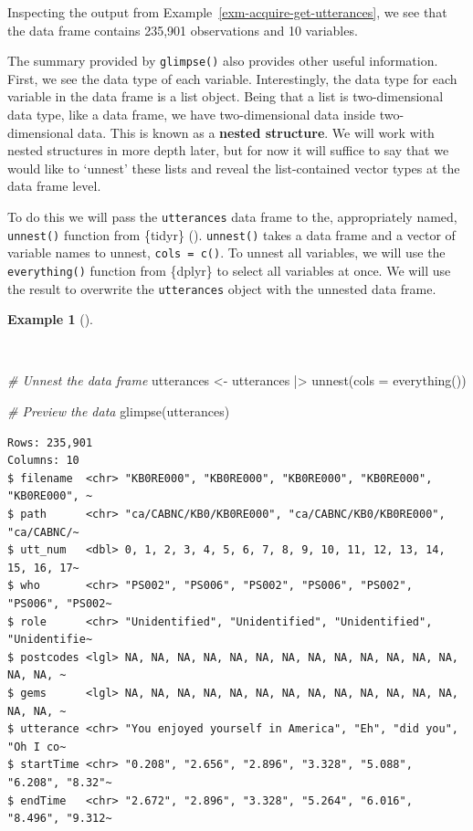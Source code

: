 \documentclass[
  letterpaper,
]{latex/krantz}
\newenvironment{Shaded}{\begin{snugshade}}{\end{snugshade}}
\newcommand{\AttributeTok}[1]{\textcolor[rgb]{0.00,0.00,0.00}{#1}}
\newcommand{\CommentTok}[1]{\textcolor[rgb]{0.00,0.00,0.00}{\textit{#1}}}
\newcommand{\FunctionTok}[1]{\textcolor[rgb]{0.00,0.00,0.00}{#1}}
\newcommand{\NormalTok}[1]{\textcolor[rgb]{0.00,0.00,0.00}{#1}}
\newcommand{\OtherTok}[1]{\textcolor[rgb]{0.00,0.00,0.00}{#1}}
\newcommand{\SpecialCharTok}[1]{\textcolor[rgb]{0.00,0.00,0.00}{#1}}
\theoremstyle{definition}
\newtheorem{example}{Example}[chapter]
\theoremstyle{remark}
\begin{document}
Inspecting the output from Example~\ref{exm-acquire-get-utterances}, we
see that the data frame contains 235,901 observations and 10 variables.

The summary provided by \texttt{glimpse()} also provides other useful
information. First, we see the data type of each variable.
Interestingly, the data type for each variable in the data frame is a
list object. Being that a list is two-dimensional data type, like a data
frame, we have two-dimensional data inside two-dimensional data. This is
known as a \textbf{nested structure}. We will work with nested
structures in more depth later, but for now it will suffice to say that
we would like to `unnest' these lists and reveal the list-contained
vector types at the data frame level.

To do this we will pass the \texttt{utterances} data frame to the,
appropriately named, \texttt{unnest()} function from \{tidyr\}
().
\texttt{unnest()} takes a data frame and a vector of variable names to
unnest, \texttt{cols\ =\ c()}. To unnest all variables, we will use the
\texttt{everything()} function from \{dplyr\} to select all variables at
once. We will use the result to overwrite the \texttt{utterances} object
with the unnested data frame.

\begin{example}[]\protect\hypertarget{exm-acquire-unnest}{}\label{exm-acquire-unnest}

~

\begin{Shaded}
\begin{Highlighting}[]
\CommentTok{\# Unnest the data frame}
\NormalTok{utterances }\OtherTok{\textless{}{-}}
\NormalTok{  utterances }\SpecialCharTok{|\textgreater{}}
  \FunctionTok{unnest}\NormalTok{(}\AttributeTok{cols =} \FunctionTok{everything}\NormalTok{())}

\CommentTok{\# Preview the data}
\FunctionTok{glimpse}\NormalTok{(utterances)}
\end{Highlighting}
\end{Shaded}

\begin{verbatim}
Rows: 235,901
Columns: 10
$ filename  <chr> "KB0RE000", "KB0RE000", "KB0RE000", "KB0RE000", "KB0RE000", ~
$ path      <chr> "ca/CABNC/KB0/KB0RE000", "ca/CABNC/KB0/KB0RE000", "ca/CABNC/~
$ utt_num   <dbl> 0, 1, 2, 3, 4, 5, 6, 7, 8, 9, 10, 11, 12, 13, 14, 15, 16, 17~
$ who       <chr> "PS002", "PS006", "PS002", "PS006", "PS002", "PS006", "PS002~
$ role      <chr> "Unidentified", "Unidentified", "Unidentified", "Unidentifie~
$ postcodes <lgl> NA, NA, NA, NA, NA, NA, NA, NA, NA, NA, NA, NA, NA, NA, NA, ~
$ gems      <lgl> NA, NA, NA, NA, NA, NA, NA, NA, NA, NA, NA, NA, NA, NA, NA, ~
$ utterance <chr> "You enjoyed yourself in America", "Eh", "did you", "Oh I co~
$ startTime <chr> "0.208", "2.656", "2.896", "3.328", "5.088", "6.208", "8.32"~
$ endTime   <chr> "2.672", "2.896", "3.328", "5.264", "6.016", "8.496", "9.312~
\end{verbatim}

\end{example}
\end{document}
